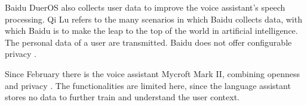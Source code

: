 Baidu DuerOS also collects user data to improve the voice assistant's speech processing. Qi Lu refers to the many scenarios in which Baidu collects data, with which Baidu is to make the leap to the top of the world in artificial intelligence. The personal data of a user are transmitted. Baidu does not offer configurable privacy \cite{baiduAI}.

Since February there is the voice assistant Mycroft Mark II, combining openness and privacy \cite{mycroftsmartspeaker}. The functionalities are limited here, since the language assistant stores no data to further train and understand the user context.